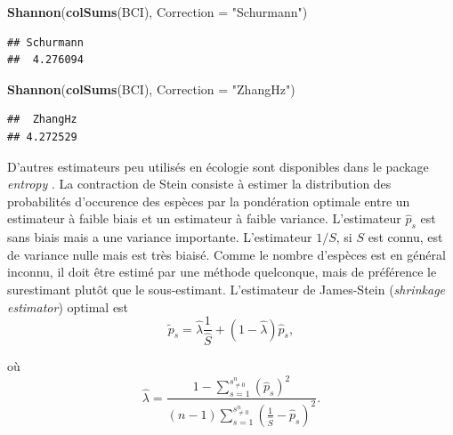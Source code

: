 \documentclass[
  11pt,
  french,
  a4paper,
  extrafontsizes,onecolumn,openright
  ]{memoir}
\newenvironment{Shaded}{\begin{snugshade}}{\end{snugshade}}
\newcommand{\AttributeTok}[1]{\textcolor[rgb]{0.13,0.29,0.53}{#1}}
\newcommand{\FunctionTok}[1]{\textcolor[rgb]{0.13,0.29,0.53}{\textbf{#1}}}
\newcommand{\NormalTok}[1]{#1}
\newcommand{\StringTok}[1]{\textcolor[rgb]{0.31,0.60,0.02}{#1}}
\begin{document}
\begin{Shaded}
\begin{Highlighting}[]
\FunctionTok{Shannon}\NormalTok{(}\FunctionTok{colSums}\NormalTok{(BCI), }\AttributeTok{Correction =} \StringTok{"Schurmann"}\NormalTok{)}
\end{Highlighting}
\end{Shaded}

\begin{verbatim}
## Schurmann 
##  4.276094
\end{verbatim}

\begin{Shaded}
\begin{Highlighting}[]
\FunctionTok{Shannon}\NormalTok{(}\FunctionTok{colSums}\NormalTok{(BCI), }\AttributeTok{Correction =} \StringTok{"ZhangHz"}\NormalTok{)}
\end{Highlighting}
\end{Shaded}

\begin{verbatim}
##  ZhangHz 
## 4.272529
\end{verbatim}

\normalsize

D'autres estimateurs peu utilisés en écologie sont disponibles dans le package \emph{entropy} \autocite{Hausser2009}.
La contraction de Stein \autocite{James1961} consiste à estimer la distribution des probabilités d'occurence des espèces par la pondération optimale entre un estimateur à faible biais et un estimateur à faible variance.
L'estimateur \(\hat{p}_s\) est sans biais mais a une variance importante.
L'estimateur \({1}/{S}\), si \(S\) est connu, est de variance nulle mais est très biaisé.
Comme le nombre d'espèces est en général inconnu, il doit être estimé par une méthode quelconque, mais de préférence le surestimant plutôt que le sous-estimant.
L'estimateur de James-Stein (\emph{shrinkage estimator}) optimal est
\begin{equation}
  \label{eq:JamesStein1}
  \tilde{p}_s = \hat{\lambda}\frac{1}{\hat{S}} + \left( 1-\hat{\lambda} \right)\hat{p}_s,
\end{equation}

où
\begin{equation}
  \label{eq:JamesStein2}
  \hat{\lambda} = \frac{1-\sum^{s^{n}_{\ne 0}}_{s=1}{\left( \hat{p}_s \right)^2}}
                  {\left( n-1 \right) \sum^{s^{n}_{\ne 0}}_{s=1}{\left( \frac{1}{\hat{S}} - \hat{p}_s \right)^2}}.
\end{equation}
\end{document}
